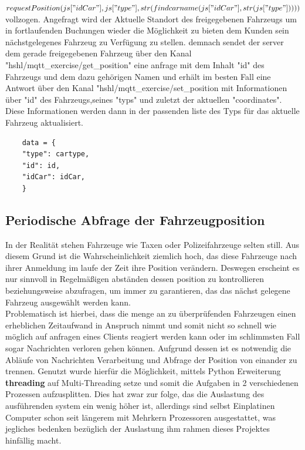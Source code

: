 \textit{$requestPosition(js["idCar"],js["type"],\\str(findcarname(js["idCar"],str(js["type"]))))$}
vollzogen.  Angefragt wird der Aktuelle Standort des freigegebenen Fahrzeugs um in fortlaufenden Buchungen wieder die Möglichkeit zu bieten dem Kunden sein nächstgelegenes Fahrzeug zu Verfügung zu stellen. demnach sendet der server dem gerade freigegebenen Fahrzeug über den Kanal \textsf{"hshl/mqtt\_exercise/get\_position"} eine anfrage mit dem Inhalt "id" des Fahrzeugs und dem dazu gehörigen Namen und erhält im besten Fall  eine Antwort über den Kanal  \textsf{"hshl/mqtt\_exercise/set\_position} mit Informationen über "id" des Fahrzeugs,seines "typs" und zuletzt der aktuellen "coordinates". Diese Informationen werden dann in der passenden liste des Typs für das aktuelle Fahrzeug aktualisiert.
\begin{lstlisting}
    data = {
    "type": cartype,
    "id": id,
    "idCar": idCar,
    }
\end{lstlisting}
\subsection{Periodische Abfrage der Fahrzeugposition}
In der Realität stehen Fahrzeuge wie Taxen oder Polizeifahrzeuge selten still. Aus diesem Grund ist die Wahrscheinlichkeit ziemlich hoch, das diese Fahrzeuge nach ihrer Anmeldung im laufe der Zeit ihre Position verändern. Deswegen erscheint es nur sinnvoll in Regelmäßigen abständen dessen position zu kontrollieren beziehungsweise abzufragen, um immer zu garantieren, das das nächst gelegene Fahrzeug ausgewählt werden kann.\\ Problematisch ist hierbei, dass die menge an zu überprüfenden Fahrzeugen einen erheblichen Zeitaufwand in Anspruch nimmt und somit nicht so schnell wie möglich auf anfragen eines Clients reagiert werden kann oder im schlimmsten Fall sogar Nachrichten verloren gehen können. Aufgrund dessen ist es notwendig die Abläufe von Nachrichten Verarbeitung und Abfrage der Position von einander zu trennen. Genutzt wurde hierfür die Möglichkeit, mittels Python Erweiterung \textbf{threading} auf Multi-Threading setze und somit die Aufgaben in 2 verschiedenen Prozessen aufzusplitten. Dies hat zwar zur folge, das die Auslastung des ausführenden system ein wenig höher ist, allerdings sind selbst Einplatinen Computer schon seit längerem mit Mehrkern Prozessoren ausgestattet, was jegliches bedenken bezüglich der Auslastung ihm rahmen dieses Projektes hinfällig macht.
